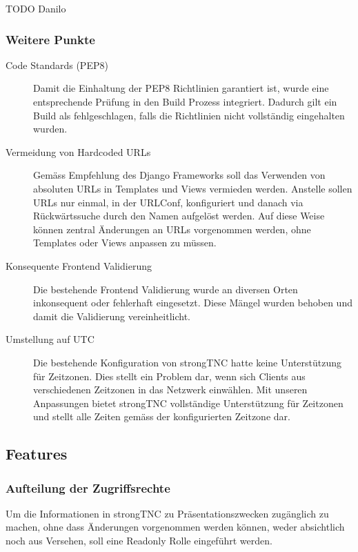 TODO Danilo

\subsubsection{Weitere Punkte}
\begin{description}

\item[Code Standards (PEP8)] Damit die Einhaltung der PEP8 Richtlinien
	garantiert ist, wurde eine entsprechende Prüfung in den Build Prozess
	integriert. Dadurch gilt ein Build als fehlgeschlagen, falls die Richtlinien
	nicht vollständig eingehalten wurden.

\item[Vermeidung von Hardcoded URLs] Gemäss Empfehlung des Django Frameworks
	soll das Verwenden von absoluten URLs in Templates und Views vermieden werden.
	Anstelle sollen URLs nur einmal, in der URLConf, konfiguriert und danach via
	Rückwärtssuche durch den Namen aufgelöst werden. Auf diese Weise können
	zentral Änderungen an URLs vorgenommen werden, ohne Templates oder Views
	anpassen zu müssen.

\item[Konsequente Frontend Validierung] Die bestehende Frontend Validierung
	wurde an diversen Orten inkonsequent oder fehlerhaft eingesetzt. Diese Mängel
	wurden behoben und damit die Validierung vereinheitlicht.

\item[Umstellung auf UTC] Die bestehende Konfiguration von strongTNC hatte keine
	Unterstützung für Zeitzonen. Dies stellt ein Problem dar, wenn sich Clients
	aus verschiedenen Zeitzonen in das Netzwerk einwählen. Mit unseren Anpassungen
	bietet strongTNC vollständige Unterstützung für Zeitzonen und stellt alle
	Zeiten gemäss der konfigurierten Zeitzone dar.

\end{description}

\subsection{Features}

\subsubsection{Aufteilung der Zugriffsrechte}
Um die Informationen in strongTNC zu Präsentationszwecken zugänglich zu machen,
ohne dass Änderungen vorgenommen werden können, weder absichtlich noch aus
Versehen, soll eine Readonly Rolle eingeführt werden.

